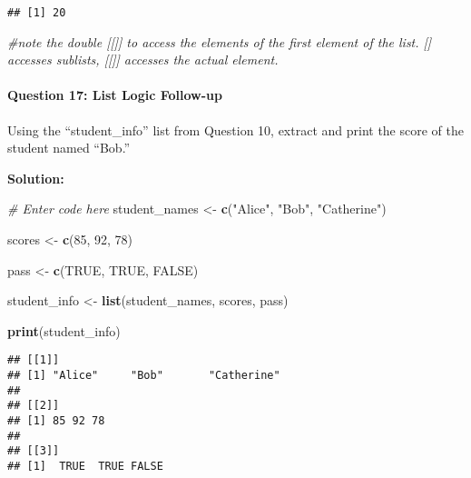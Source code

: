 \documentclass[
]{article}
\newenvironment{Shaded}{\begin{snugshade}}{\end{snugshade}}
\newcommand{\CommentTok}[1]{\textcolor[rgb]{0.56,0.35,0.01}{\textit{#1}}}
\newcommand{\ConstantTok}[1]{\textcolor[rgb]{0.56,0.35,0.01}{#1}}
\newcommand{\DecValTok}[1]{\textcolor[rgb]{0.00,0.00,0.81}{#1}}
\newcommand{\FunctionTok}[1]{\textcolor[rgb]{0.13,0.29,0.53}{\textbf{#1}}}
\newcommand{\NormalTok}[1]{#1}
\newcommand{\OtherTok}[1]{\textcolor[rgb]{0.56,0.35,0.01}{#1}}
\newcommand{\StringTok}[1]{\textcolor[rgb]{0.31,0.60,0.02}{#1}}
\begin{document}
\begin{verbatim}
## [1] 20
\end{verbatim}

\begin{Shaded}
\begin{Highlighting}[]
\CommentTok{\#note the double [[]] to access the elements of the first element of the list. [] accesses sublists, [[]] accesses the actual element.}
\end{Highlighting}
\end{Shaded}

\hypertarget{question-17-list-logic-follow-up}{%
\paragraph{Question 17: List Logic
Follow-up}\label{question-17-list-logic-follow-up}}

Using the ``student\_info'' list from Question 10, extract and print the
score of the student named ``Bob.''

\textbf{Solution:}

\begin{Shaded}
\begin{Highlighting}[]
\CommentTok{\# Enter code here}
\NormalTok{student\_names }\OtherTok{\textless{}{-}} \FunctionTok{c}\NormalTok{(}\StringTok{"Alice"}\NormalTok{, }\StringTok{"Bob"}\NormalTok{, }\StringTok{"Catherine"}\NormalTok{)}

\NormalTok{scores }\OtherTok{\textless{}{-}} \FunctionTok{c}\NormalTok{(}\DecValTok{85}\NormalTok{, }\DecValTok{92}\NormalTok{, }\DecValTok{78}\NormalTok{)}

\NormalTok{pass }\OtherTok{\textless{}{-}} \FunctionTok{c}\NormalTok{(}\ConstantTok{TRUE}\NormalTok{, }\ConstantTok{TRUE}\NormalTok{, }\ConstantTok{FALSE}\NormalTok{)}

\NormalTok{student\_info }\OtherTok{\textless{}{-}} \FunctionTok{list}\NormalTok{(student\_names, scores, pass)}

\FunctionTok{print}\NormalTok{(student\_info)}
\end{Highlighting}
\end{Shaded}

\begin{verbatim}
## [[1]]
## [1] "Alice"     "Bob"       "Catherine"
## 
## [[2]]
## [1] 85 92 78
## 
## [[3]]
## [1]  TRUE  TRUE FALSE
\end{verbatim}

\begin{Shaded}
\end{Shaded}
\end{document}
